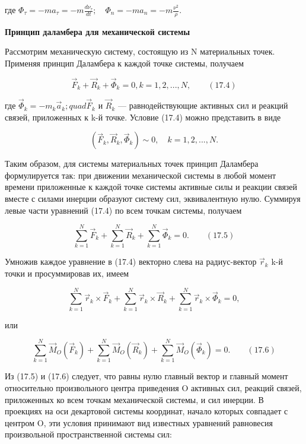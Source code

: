 {\begin{center}
	  \par где $ \Phi_{\tau} = -m a_{\tau} = -m \frac{d \nu_{\tau}}{dt}; \quad \Phi_{n} = -m a_n = -m \frac{\nu^2}{\rho}$.
        \par\textbf{Принцип даламбера для механической системы}

	  \par Рассмотрим механическую систему,  состоящую  из  N материальных  точек. Применяя принцип Даламбера к каждой точке системы, получаем

	  $$ \vec F_k + \vec R_k + \vec\Phi_k = 0, k = 1,2,...,N, \qquad (17.4)$$

	  \par где $ \vec\Phi_k = -m_k \vec a_k; quad \vec F_k$ и $\vec R_k$ — равнодействующие активных сил и реакций связей, приложенных к k-й точке. Условие (17.4) можно представить в виде
	  
	  $$(\vec F_k, \vec R_k, \vec\Phi_k) \sim 0, \quad k=1,2,...,N.$$

	  \par Таким  образом,  для  системы  материальных  точек  принцип  Даламбера формулируется так: при движении механической системы в любой момент времени приложенные к  каждой  точке системы активные силы  и  реакции связей вместе с силами инерции образуют систему сил, эквивалентную нулю. Суммируя левые части уравнений (17.4) по всем точкам системы, получаем

	  $$ \sum\limits_{k=1}^N \vec F_k + \sum\limits_{k=1}^N \vec R_k + \sum\limits_{k=1}^N \vec\Phi_k = 0. \qquad (17.5)$$

	  \par Умножив каждое уравнение в (17.4) векторно слева на радиус-вектор $\vec r_k$ k-й точки и просуммировав их, имеем
     
	  $$ \sum\limits_{k=1}^N \vec r_k \times \vec F_k + \sum\limits_{k=1}^N \vec r_k \times \vec R_k + \sum\limits_{k=1}^N \vec r_k \times \vec\Phi_k = 0,$$

	  \par или

	  $$ \sum\limits_{k=1}^N \vec M_O (\vec F_k) + \sum\limits_{k=1}^N \vec M_O (\vec R_k) + \sum\limits_{k=1}^N \vec M_O (\vec\Phi_k) = 0. \qquad (17.6)$$

	  \par Из (17.5) и (17.6) следует, что равны нулю главный вектор и главный момент  относительно  произвольного  центра  приведения O активных сил, реакций  связей,  приложенных  ко  всем  точкам  механической  системы,  и  сил инерции. В проекциях на оси декартовой системы координат, начало которых совпадает с центром O, эти условия принимают вид известных уравнений равновесия произвольной пространственной системы сил:


\end{center}}
